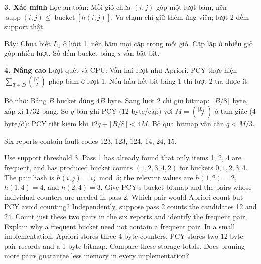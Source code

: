 \documentclass[10pt,a4paper,twocolumn]{article}
\newcommand{\key}[1]{#1:\enspace}
\newcommand{\unitheading}[2]{%
  \par\addvspace{1pt}\noindent\textbf{#1. #2}\enspace}
\newcommand{\unitverification}{\unitheading{3}{Xác minh}}
\newcommand{\unitadvanced}{\unitheading{4}{Nâng cao}}
\begin{document}
\unitverification
\key{Lọc an toàn} Mỗi giỏ chứa $(i,j)$ góp một lượt băm, nên $\operatorname{supp}(i,j)\le\operatorname{bucket}[h(i,j)]$. Va chạm chỉ giữ thêm ứng viên; lượt 2 đếm support thật.

\key{Bẫy} Chưa biết $L_1$ ở lượt 1, nên băm mọi cặp trong mỗi giỏ. Cặp lặp ở nhiều giỏ góp nhiều lượt. Số đếm bucket bằng $s$ vẫn bật bit.


\unitadvanced
\key{Lượt quét và CPU} Vẫn hai lượt như Apriori. PCY thực hiện $\sum_{T\in D}\binom{|T|}{2}$ phép băm ở lượt 1. Nếu hầu hết bit bằng 1 thì lượt 2 tỉa được ít.

\key{Bộ nhớ} Bảng $B$ bucket dùng $4B$ byte. Sang lượt 2 chỉ giữ bitmap: $\lceil B/8\rceil$ byte, xấp xỉ $1/32$ bảng. So $q$ bản ghi PCY (12 byte/cặp) với $M=\binom{|L_1|}{2}$ ô tam giác (4 byte/ô): PCY tiết kiệm khi $12q+\lceil B/8\rceil<4M$. Bỏ qua bitmap vẫn cần $q<M/3$.

Six reports contain fault codes 123, 123, 124, 14, 24, 15.

Use support threshold 3. Pass 1 has already found that only items 1, 2, 4 are frequent, and has produced bucket counts $(1,2,3,4,2)$ for buckets $0,1,2,3,4$. The pair hash is $h(i,j)=ij\bmod5$; the relevant values are $h(1,2)=2$, $h(1,4)=4$, and $h(2,4)=3$.
 Give PCY's bucket bitmap and the pairs whose individual counters are needed in pass 2. Which pair would Apriori count but PCY avoid counting?
 Independently, suppose pass 2 counts the candidates 12 and 24. Count just these two pairs in the six reports and identify the frequent pair. Explain why a frequent bucket need not contain a frequent pair.
 In a small implementation, Apriori stores three 4-byte counters. PCY stores two 12-byte pair records and a 1-byte bitmap. Compare these storage totals. Does pruning more pairs guarantee less memory in every implementation?
\end{document}
